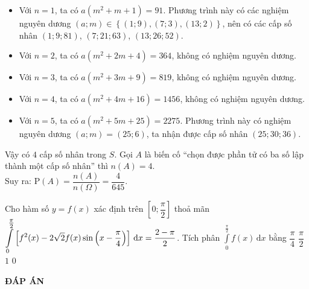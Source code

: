 \documentclass[12pt,a4paper,oneside]{book}
\begin{document}
\begin{ex}
{\begin{itemize}
			\item Với $n=1$, ta có $a\left(m^2+m+1\right)=91$. Phương trình này có các nghiệm nguyên dương $(a;m)\in \left\{(1;9), (7;3), (13;2)\right\}$, nên có các cấp số nhân $(1;9;81)$, $(7;21;63)$, $(13;26;52)$.
			\item Với $n=2$, ta có $a\left(m^2+2m+4\right)=364$, không có nghiệm nguyên dương.
			\item Với $n=3$, ta có $a\left(m^2+3m+9\right)=819$, không có nghiệm nguyên dương.
			\item Với $n=4$, ta có $a\left(m^2+4m+16\right)=1456$, không có nghiệm nguyên dương.
			\item Với $n=5$, ta có $a\left(m^2+5m+25\right)=2275$. Phương trình này có nghiệm nguyên dương $(a;m)=(25;6)$, ta nhận được cấp số nhân $(25;30;36)$.
		\end{itemize}
		Vậy có $4$ cấp số nhân trong $S$. Gọi $A$ là biến cố ``chọn được phần tử có ba số lập thành một cấp số nhân'' thì $n(A)=4$.\\
		Suy ra: $\mathrm{P}(A)=\dfrac{n(A)}{n(\Omega)}=\dfrac{4}{645}$.
	}
\end{ex}

\begin{ex}%
	Cho hàm số $y=f(x)$ xác định trên $\left[0;\dfrac{\pi}{2}\right]$ thoả mãn $\break \displaystyle \int\limits_0^{\tfrac{\pi}{2}} \left[f^2(x)-2\sqrt{2}f(x)\sin\left(x-\dfrac{\pi}{4}\right)\right]\mathrm{\,d}x=\dfrac{2-\pi}{2}$. Tích phân $\displaystyle \int\limits_0^{\tfrac{\pi}{2}} f(x)\mathrm{\,d}x$ bằng
	\choice
	{$\dfrac{\pi}{4}$}
	{$\dfrac{\pi}{2}$}
	{$1$}
	{\True $0$}
\end{ex}











\newpage
\begin{center}
	\textbf{ĐÁP ÁN}
\end{center}
\begin{multicols}{10}
	 
\end{multicols}
\end{document}

